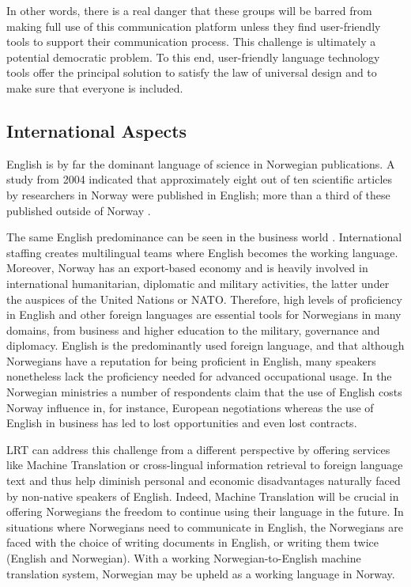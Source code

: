 \begin{multicols}{2}
In other words, there is a real danger that these groups will be barred from making full use of this communication platform unless they find user-friendly tools to support their communication process. 
This challenge is ultimately a potential democratic problem. 
To this end, user-friendly language technology tools offer the principal solution to satisfy the law of universal design and to make sure that everyone is included.

\subsection{International Aspects}

English is by far the dominant language of science in Norwegian publications. 
A study from 2004 indicated that approximately eight out of ten scientific articles by researchers in Norway were published in English; more than a third of these published outside of Norway \cite{schwach2004}.

The same English predominance can be seen in the business world \cite{SR:2010,Hel:2010}. 
International staffing creates multilingual teams where English becomes the working language. 
Moreover, Norway has an export-based economy and is heavily involved in international humanitarian, diplomatic and military activities, the latter under the auspices of the United Nations or NATO. 
Therefore, high levels of proficiency in English and other foreign languages are essential tools for Norwegians in many domains, from business and higher education to the military, governance and diplomacy. 
English is the predominantly used foreign language, and that although Norwegians have a reputation for being proficient in English, many speakers nonetheless lack the proficiency needed for advanced occupational usage. 
In the Norwegian ministries a number of respondents claim that the use of English costs Norway influence in, for instance, European negotiations whereas the use of English in business has led to lost opportunities and even lost contracts.


LRT can address this challenge from a different perspective by offering services like Machine Translation or cross-lingual information retrieval to foreign language text and thus help diminish personal and economic disadvantages naturally faced by non-native speakers of English. 
Indeed, Machine Translation will be crucial in offering Norwegians the freedom to continue using their language in the future. 
In situations where Norwegians need to communicate in English, the Norwegians are faced with the choice of writing documents in English, or writing them twice (English and Norwegian). 
With a working Norwegian-to-English machine translation system, Norwegian may be upheld as a working language in Norway.


\end{multicols}
